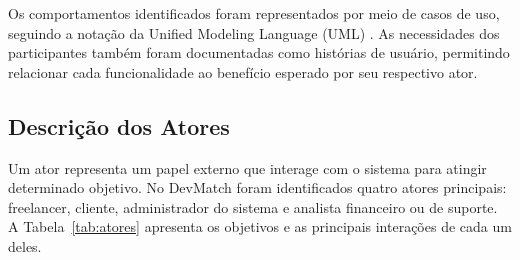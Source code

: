\documentclass[portuguese]{sbcreviews-2025}
\begin{document}
Os comportamentos identificados foram representados por meio de casos
de uso, seguindo a notação da Unified Modeling Language (UML)
\citep{omguml}. As necessidades dos participantes também foram
documentadas como histórias de usuário, permitindo relacionar cada
funcionalidade ao benefício esperado por seu respectivo ator.


\subsection{Descrição dos Atores}
\label{subsec:atores}

Um ator representa um papel externo que interage com o sistema para
atingir determinado objetivo. No DevMatch foram identificados quatro
atores principais: freelancer, cliente, administrador do sistema e
analista financeiro ou de suporte. A Tabela~\ref{tab:atores}
apresenta os objetivos e as principais interações de cada um deles.
\end{document}
